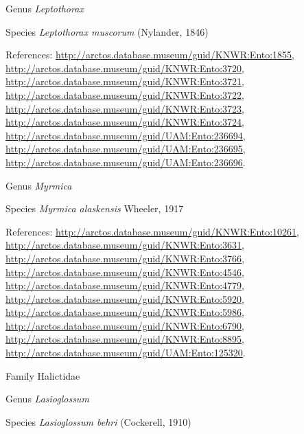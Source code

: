 \documentclass[9pt, article]{memoir}
\begin{document}
\begin{multicols}{2}
\vspace{6pt}\noindent\hspace{30pt}Genus \textit{Leptothorax}


\vspace{6pt}\noindent\hspace{36pt}Species \textit{Leptothorax muscorum} (Nylander, 1846)


\vspace{6pt}References: 
\url{http://arctos.database.museum/guid/KNWR:Ento:1855}, 
\url{http://arctos.database.museum/guid/KNWR:Ento:3720}, 
\url{http://arctos.database.museum/guid/KNWR:Ento:3721}, 
\url{http://arctos.database.museum/guid/KNWR:Ento:3722}, 
\url{http://arctos.database.museum/guid/KNWR:Ento:3723}, 
\url{http://arctos.database.museum/guid/KNWR:Ento:3724}, 
\url{http://arctos.database.museum/guid/UAM:Ento:236694}, 
\url{http://arctos.database.museum/guid/UAM:Ento:236695}, 
\url{http://arctos.database.museum/guid/UAM:Ento:236696}.

\vspace{6pt}\noindent\hspace{30pt}Genus \textit{Myrmica}


\vspace{6pt}\noindent\hspace{36pt}Species \textit{Myrmica alaskensis} Wheeler, 1917


\vspace{6pt}References: 
\url{http://arctos.database.museum/guid/KNWR:Ento:10261}, 
\url{http://arctos.database.museum/guid/KNWR:Ento:3631}, 
\url{http://arctos.database.museum/guid/KNWR:Ento:3766}, 
\url{http://arctos.database.museum/guid/KNWR:Ento:4546}, 
\url{http://arctos.database.museum/guid/KNWR:Ento:4779}, 
\url{http://arctos.database.museum/guid/KNWR:Ento:5920}, 
\url{http://arctos.database.museum/guid/KNWR:Ento:5986}, 
\url{http://arctos.database.museum/guid/KNWR:Ento:6790}, 
\url{http://arctos.database.museum/guid/KNWR:Ento:8895}, 
\url{http://arctos.database.museum/guid/UAM:Ento:125320}.

\vspace{6pt}\noindent\hspace{24pt}Family Halictidae


\vspace{6pt}\noindent\hspace{30pt}Genus \textit{Lasioglossum}


\vspace{6pt}\noindent\hspace{36pt}Species \textit{Lasioglossum behri} (Cockerell, 1910)



\end{multicols}
\end{document}
